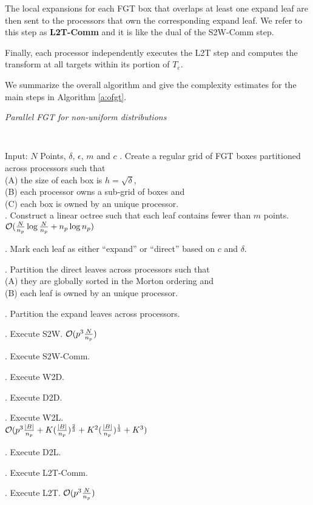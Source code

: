 The local expansions for each FGT box that overlaps at least one expand leaf are then sent to the processors that own
 the corresponding expand leaf. We refer to this step as {\textbf{L2T-Comm}} and it is like the dual of the S2W-Comm step. 
 
Finally, each processor independently executes the L2T step and computes the transform at all targets within its portion of $T_e$.

We summarize the overall algorithm and give the complexity estimates for the main steps in Algorithm \ref{a:ofgt}.  

\begin{algorithm}[!h]
\caption{ \label{a:ofgt}
\em Parallel FGT for non-uniform distributions}
{\tt
\begin{algorithmic}
\STATE Input: $N$ Points, $\delta$, $\epsilon$, $m$ and $c$
. Create a regular grid of FGT boxes partitioned across processors such that \\
 (A) the size of each box is $h = \sqrt{\delta}$, \\
 (B) each processor owns a sub-grid of boxes and \\
 (C) each box is owned by an unique processor. \\

. Construct a linear octree such that each leaf contains fewer than $m$ points. \\
\hfill $\mathcal{O}(\frac{N}{n_p} \log{\frac{N}{n_p}} + n_p \log{n_p})$

. Mark each leaf as either ``expand'' or ``direct'' based on $c$ and $\delta$.

. Partition the direct leaves across processors such that \\
  (A) they are globally sorted in the Morton ordering and \\
  (B) each leaf is owned by an unique processor.

. Partition the expand leaves across processors. 

. Execute S2W. \hfill $\mathcal{O}(p^3 \frac{N}{n_p})$

. Execute S2W-Comm. 

. Execute W2D. 

. Execute D2D. 

. Execute W2L. \\
 \hfill $\mathcal{O}(p^3 \frac{|B|}{n_p} + K (\frac{|B|}{n_p})^{\frac{2}{3}} + K^2(\frac{|B|}{n_p})^{\frac{1}{3}} + K^3 )$ 

. Execute D2L. 

. Execute L2T-Comm. 

. Execute L2T. \hfill $\mathcal{O}( p^3\frac{N}{n_p})$
\end{algorithmic}
}
\end{algorithm}


